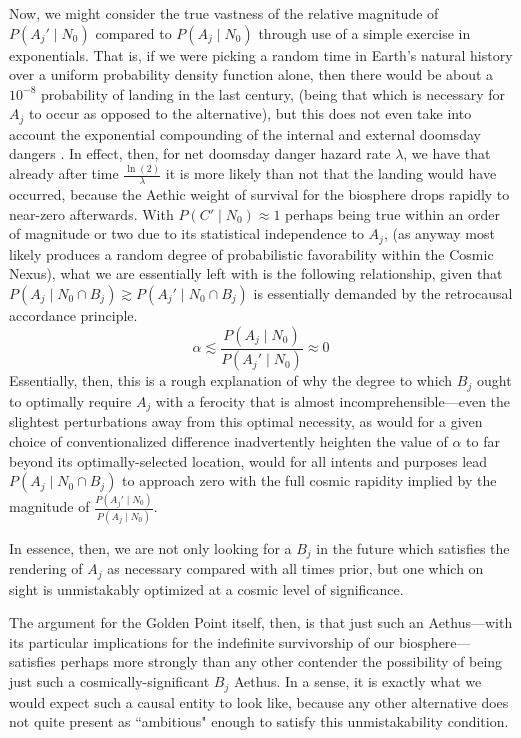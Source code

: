 \begin{concept}
\begin{enumerate}
\begin{equation}
        \end{equation}
        Now, we might consider the true vastness of the relative magnitude of $P \! \left( A_j' \mid N_0 \right)$ compared to $P \! \left( A_j \mid N_0 \right)$ through use of a simple exercise in exponentials. That is, if we were picking a random time in Earth's natural history over a uniform probability density function alone, then there would be about a ${10}^{-8}$ probability of landing in the last century, (being that which is necessary for $A_j$ to occur as opposed to the alternative), but this does not even take into account the exponential compounding of the internal and external doomsday dangers \cite{Nexus}. In effect, then, for net doomsday danger hazard rate $\lambda$, we have that already after time $\frac{\ln \! \left( 2 \right)}{\lambda}$ it is more likely than not that the landing would have occurred, because the Aethic weight of survival for the biosphere drops rapidly to near-zero afterwards. With $P \! \left( C' \mid N_0 \right) \approx 1$ perhaps being true within an order of magnitude or two due to its statistical independence to $A_j$, (as anyway most likely produces a random degree of probabilistic favorability within the Cosmic Nexus), what we are essentially left with is the following relationship, given that $P \! \left( A_j \mid N_0 \cap B_j \right) \gtrsim P \! \left( A_j' \mid N_0 \cap B_j \right)$ is essentially demanded by the retrocausal accordance principle.
        \begin{equation}
            \alpha \lesssim \frac{P \! \left( A_j \mid N_0 \right)}{P \! \left( A_j' \mid N_0 \right)} \approx 0
        \end{equation}
        Essentially, then, this is a rough explanation of why the degree to which $B_j$ ought to optimally require $A_j$ with a ferocity that is almost incomprehensible---even the slightest perturbations away from this optimal necessity, as would for a given choice of conventionalized difference inadvertently heighten the value of $\alpha$ to far beyond its optimally-selected location, would for all intents and purposes lead $P \! \left( A_j \mid N_0 \cap B_j \right)$ to approach zero with the full cosmic rapidity implied by the magnitude of $\frac{P \! \left( A_j' \mid N_0 \right)}{P \! \left( A_j \mid N_0 \right)}$. 
        
        In essence, then, we are not only looking for a $B_j$ in the future which satisfies the rendering of $A_j$ as necessary compared with all times prior, but one which on sight is unmistakably optimized at a cosmic level of significance.
    \end{enumerate}
    The argument for the Golden Point itself, then, is that just such an Aethus---with its particular implications for the indefinite survivorship of our biosphere---satisfies perhaps more strongly than any other contender the possibility of being just such a cosmically-significant $B_j$ Aethus. In a sense, it is exactly what we would expect such a causal entity to look like, because any other alternative does not quite present as ``ambitious" enough to satisfy this unmistakability condition. 


\end{concept}
